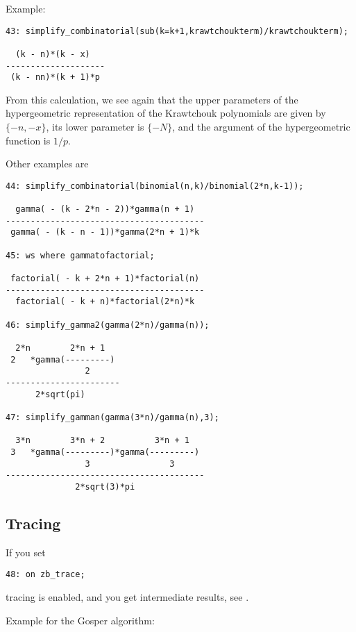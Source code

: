 Example:

{\small
\begin{verbatim}
43: simplify_combinatorial(sub(k=k+1,krawtchoukterm)/krawtchoukterm);

  (k - n)*(k - x)
--------------------
 (k - nn)*(k + 1)*p
\end{verbatim}
}\noindent
From this calculation, we see again that the upper parameters of
the hypergeometric representation of the Krawtchouk polynomials are given by
$\{-n,-x\}$, its lower parameter is $\{-N\}$, and the argument of the
hypergeometric function is $1/p$.

Other examples are

{\small
\begin{verbatim}
44: simplify_combinatorial(binomial(n,k)/binomial(2*n,k-1));

  gamma( - (k - 2*n - 2))*gamma(n + 1)
----------------------------------------
 gamma( - (k - n - 1))*gamma(2*n + 1)*k

45: ws where gammatofactorial;

 factorial( - k + 2*n + 1)*factorial(n)
----------------------------------------
  factorial( - k + n)*factorial(2*n)*k

46: simplify_gamma2(gamma(2*n)/gamma(n));

  2*n        2*n + 1
 2   *gamma(---------)
                2
-----------------------
      2*sqrt(pi)

47: simplify_gamman(gamma(3*n)/gamma(n),3);

  3*n        3*n + 2          3*n + 1
 3   *gamma(---------)*gamma(---------)
                3                3
----------------------------------------
              2*sqrt(3)*pi
\end{verbatim}
}\noindent

\subsection{Tracing}

If you set
{\small
\begin{verbatim}
48: on zb_trace;
\end{verbatim}
}\noindent
tracing is enabled, and you get intermediate results, see \cite{Koepf:94b}.

Example for the Gosper algorithm:

